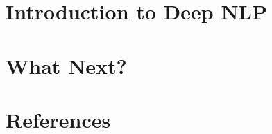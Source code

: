 \section[DNLP]{Introduction to Deep NLP}


\section[Next]{What Next?}


\section[Refs]{References}

